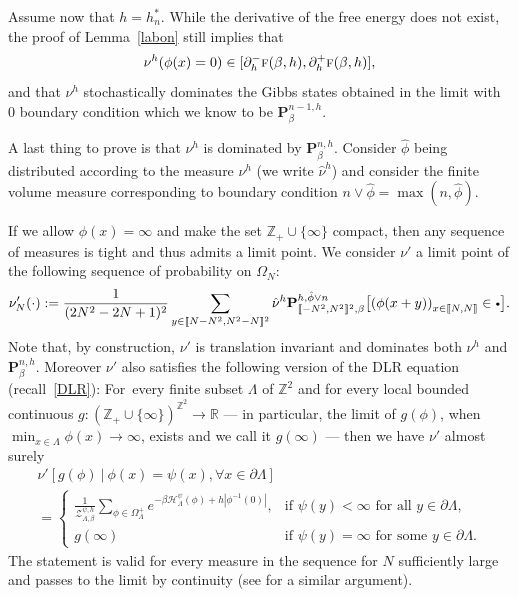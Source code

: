 \documentclass[10pt]{amsart}
\let\mathcal\mathscr
\newcommand{\sbullet}{{\scriptscriptstyle\bullet}}
\newcommand{\csbullet}{{\raisebox{1pt}{$\sbullet$}}}
\numberwithin{equation}{section}
\theoremstyle{plain}
\theoremstyle{definition}
\newcommand{\lint}{\llbracket}
\newcommand{\rint}{\rrbracket}
\newcommand{\cH}{{\ensuremath{\mathcal H}} }
\newcommand{\cZ}{{\ensuremath{\mathcal Z}} }
\newcommand{\bP}{{\ensuremath{\mathbf P}} }
\newcommand{\bbR}{{\ensuremath{\mathbb R}} }
\newcommand{\bbZ}{{\ensuremath{\mathbb Z}} }
\newcommand{\gb}{\beta}
\newcommand{\gO}{\Omega}
\newcommand{\gL}{\Lambda}
\newcommand{\tf}{\textsc{f}}
\begin{document}
Assume now that $h=h^*_n$.
While the derivative of the free energy does not exist, the proof of Lemma~\ref{labon} still implies that
\[
\nu^h(\phi(x)=0)\in [\partial^-_h \tf(\gb,h),\partial^+_h\tf(\gb,h)],
\]
and that $\nu^h$ stochastically
dominates the Gibbs states obtained in the limit with $0$ boundary condition which we know to be $\bP^{n-1,h}_\gb$.

A last thing to prove is that $\nu^h$ is dominated by $\bP^{n,h}_{\gb}$.
Consider $\hat \phi$ being distributed according to the measure $\nu^h$ (we write $\hat \nu^h$)
and consider the finite volume measure corresponding to boundary condition $n\vee\hat \phi=\max(n,\hat \phi)$.

If we allow $\phi(x)=\infty$ and make the set $\bbZ_+\cup\{\infty\}$ compact, then any sequence of measures is tight and thus admits a limit point.
We consider $\nu'$ a limit point of the following sequence of probability on $\gO_N$:
\begin{equation*}
\nu'_N(\cdot):=\frac{1}{(2N^2-2N+1)^2}\sum_{y\in \lint N-N^2,N^2-N\rint^2}\hat \nu^h \bP^{h,\hat \phi\vee n}_{\lint -N^2,N^2\rint^2,\gb}\bigl[ \left(\phi(x+y)\right)_{x\in \lint N,N\rint} \in \csbullet \bigr].
\end{equation*}
Note that, by construction, $\nu'$ is translation invariant and dominates both $\nu^h$ and $\bP^{n,h}_{\gb}$.
Moreover $\nu'$ also satisfies the following version of the DLR equation (recall~\eqref{DLR}):
For~every finite subset $\gL$ of $\bbZ^2$ and for every local bounded continuous \hbox{$g: (\bbZ_+\cup\{\infty\})^{\bbZ^2} \to \bbR$} --- in
particular, the limit of $g(\phi)$, when $\min_{x\in \gL}\phi(x)\to \infty$, exists and we call it $g(\infty)$ --- then we have $\nu'$ almost surely
\begin{multline*}%
\nu'\left[ g(\phi) \ | \ \phi(x)=\psi(x), \forall x\in \partial \gL\right]\\=
\begin{cases}
\frac{1}{\cZ^{\psi,h}_{\gL,\gb}}\sum_{\phi\in \gO^+_{\gL}}e^{-\beta\cH^{\psi}_{\gL}(\phi)+h|\phi^{-1}(0)|},
&\text{if } \psi(y)<\infty \text{ for all } y \in \partial \gL,\\
g(\infty) &\text{if } \psi(y)=\infty \text{ for some } y \in \partial \gL.
\end{cases}
\end{multline*}
The statement is valid for every measure in the sequence for $N$ sufficiently large and passes to the limit by continuity
(see \cite[Eq.\,(5.3)]{cf:GL} for a similar argument).
\end{document}
